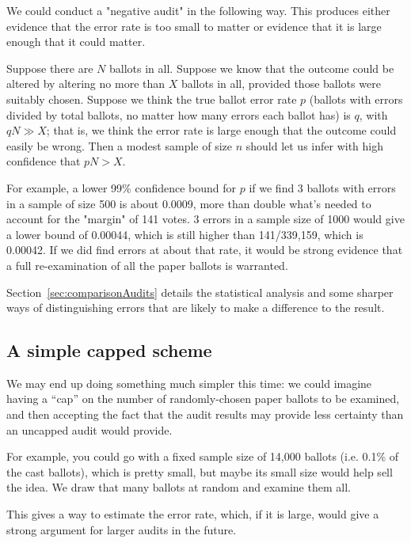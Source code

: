 \documentclass[10pt,a4paper]{article}
\begin{document}
We could conduct a "negative audit" in the following way.  
This produces either evidence that the error rate is too small to matter or evidence that it is large enough that it could matter.

Suppose there are $N$ ballots in all.
Suppose we know that the outcome could be altered by altering no more than $X$ ballots in all, provided those ballots were suitably chosen.  Suppose
we think the true ballot error rate $p$ (ballots with errors divided by total ballots, no matter how many errors each ballot has) is $q$, with $qN \gg X$; that is, we think the error rate is large enough that the outcome could easily be wrong.  Then a modest sample
of size $n$ should let us infer with high confidence that $pN > X$. 

For example, a lower 99\% confidence bound for $p$ if we find 3 ballots with errors in a sample of size 500 is about 0.0009, more than double
what's needed to account for the "margin" of 141 votes. 3 errors in a sample size of 1000 would give a lower bound of 0.00044, which is still higher than
141/339,159, which is 0.00042.  If we did find errors at about that rate, it would be strong evidence that a full re-examination of all the paper ballots is warranted.

Section~\ref{sec:comparisonAudits} details the statistical analysis and some sharper ways of distinguishing errors that are likely to make a difference to the result.

\subsection{A simple capped scheme}
We may end up doing something much simpler this time: we
could imagine having a ``cap'' on the number of randomly-chosen 
paper ballots to be examined, and then accepting the fact that
the audit results may provide less certainty than an uncapped
audit would provide.

For example, you could go with a fixed sample size of 14,000
ballots (i.e. 0.1\% of the cast ballots), which is pretty small, but
maybe its small size would help sell the idea.  We draw that
many ballots at random and examine them all.

This gives a way to estimate the error rate, which, if it is large, would give a strong argument for larger audits in the
future.
\end{document}
